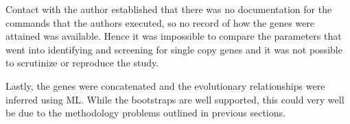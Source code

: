 \documentclass[12pt]{article}
\begin{document}
Contact with the author established that there was no documentation for the commands that the authors executed, so no record of how the genes were attained was available. 
Hence it was impossible to compare the parameters that went into identifying and screening for single copy genes and it was not possible to scrutinize or reproduce the study.

Lastly, the genes were concatenated and the evolutionary relationships were inferred using ML. 
While the bootstraps are well supported, this could very well be due to the methodology problems outlined in previous sections.
\end{document}

